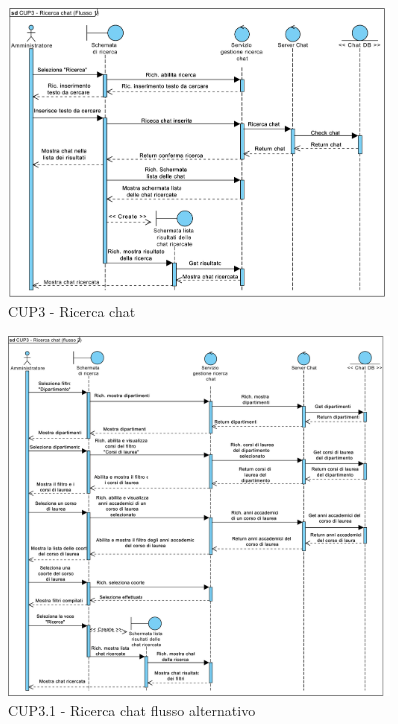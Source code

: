 \begin{figure}
	\centering
	\includegraphics[width=0.9\textwidth]{imgs/gruppo6/sequence/CUP3_ricerca_chat_flusso_1.pdf}
	\caption{CUP3 - Ricerca chat}
	\label{fig:seq-cup3}
\end{figure}

\begin{figure}
	\centering
	\includegraphics[width=0.9\textwidth]{imgs/gruppo6/sequence/CUP3_ricerca_chat_flusso_2.pdf}
	\caption{CUP3.1 - Ricerca chat flusso alternativo}
	\label{fig:seq-cup3mod}
\end{figure}

